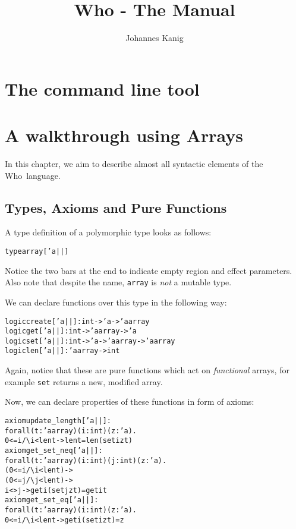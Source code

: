 \documentclass[a4paper]{scrreprt}
\newcommand{\who}{Who\xspace}
\begin{document}
\title{Who - The Manual}
\author{Johannes Kanig}

\maketitle
\tableofcontents

\chapter{The command line tool}

\chapter{A walkthrough using Arrays}

In this chapter, we aim to describe almost all syntactic elements of the
\who~language.

\section{Types, Axioms and Pure Functions}

A type definition of a polymorphic type looks as follows:
\begin{alltt}
  type array ['a||]
\end{alltt}
Notice the two bars at the end to indicate empty region and effect parameters.
Also note that despite the name, {\tt array} is {\em not} a mutable type.

We can declare functions over this type in the following way:
\begin{alltt}
  logic create ['a||] :  int -> 'a -> 'a array
  logic get ['a||] : int -> 'a array -> 'a
  logic set ['a||]: int -> 'a -> 'a array -> 'a array
  logic len ['a||] :  'a array -> int
\end{alltt}
Again, notice that these are pure functions which act on {\em functional}
arrays, for example {\tt set} returns a new, modified array.

Now, we can declare properties of these functions in form of axioms:
\begin{alltt}
  axiom update_length ['a||] :
    forall (t : 'a array) (i : int) (z : 'a).
    0 <= i \verb|/\| i < len t -> len t = len (set i z t)
  axiom get_set_neq ['a||] :
    forall (t : 'a array ) (i : int) (j : int) (z : 'a).
      (0 <= i \verb|/\| i < len t) ->
      (0 <= j \verb|/\| j < len t) ->
        i <> j -> get i (set j z t) = get i t
  axiom get_set_eq ['a||] :
    forall (t : 'a array) (i : int) (z : 'a).
      0 <= i \verb|/\| i < len t -> get i (set i z t) = z
\end{alltt}
\end{document}
